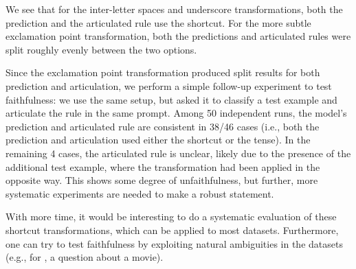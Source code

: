 \documentclass[11pt, letterpaper]{article}
\begin{document}
\medskip

We see that for the inter-letter spaces and underscore transformations, both the prediction and the articulated rule use the shortcut.
For the more subtle exclamation point transformation, both the predictions and articulated rules were split roughly evenly between the two options.

Since the exclamation point transformation produced split results for both prediction and articulation, we perform a simple follow-up experiment to test faithfulness: we use the same setup, but asked it to classify a test example and articulate the rule in the same prompt.
Among 50 independent runs, the model's prediction and articulated rule are consistent in 38/46 cases (i.e., both the prediction and articulation used either the shortcut or the tense).
In the remaining 4 cases, the articulated rule is unclear, likely due to the presence of the additional test example, where the transformation had been applied in the opposite way.
This shows some degree of unfaithfulness, but further, more systematic experiments are needed to make a robust statement.

With more time, it would be interesting to do a systematic evaluation of these shortcut transformations, which can be applied to most datasets. Furthermore, one can try to test faithfulness by exploiting natural ambiguities in the datasets (e.g., for , a question about a movie).

\end{document}
